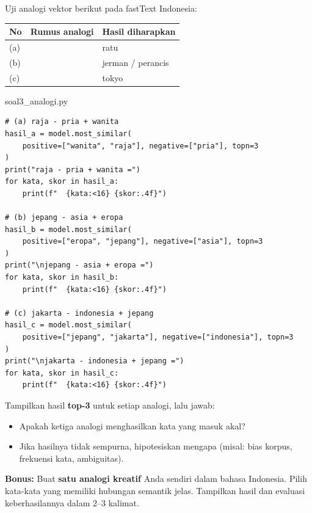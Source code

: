 \documentclass[12pt, a4paper]{article}
\begin{document}
Uji analogi vektor berikut pada fastText Indonesia:

\begin{center}\small
\begin{tabular}{@{} C{0.6cm} L{6.5cm} L{4cm} @{}}
  \toprule \textbf{No} & \textbf{Rumus analogi} & \textbf{Hasil diharapkan} \\
  \midrule
  (a) &           & ratu \\
  (b) &          & jerman / perancis \\
  (c) &   & tokyo \\
  \bottomrule
\end{tabular}
\end{center}

\begin{codewindow}{soal3\_analogi.py}
\begin{lstlisting}[style=pycode]
# (a) raja - pria + wanita
hasil_a = model.most_similar(
    positive=["wanita", "raja"], negative=["pria"], topn=3
)
print("raja - pria + wanita =")
for kata, skor in hasil_a:
    print(f"  {kata:<16} {skor:.4f}")

# (b) jepang - asia + eropa
hasil_b = model.most_similar(
    positive=["eropa", "jepang"], negative=["asia"], topn=3
)
print("\njepang - asia + eropa =")
for kata, skor in hasil_b:
    print(f"  {kata:<16} {skor:.4f}")

# (c) jakarta - indonesia + jepang
hasil_c = model.most_similar(
    positive=["jepang", "jakarta"], negative=["indonesia"], topn=3
)
print("\njakarta - indonesia + jepang =")
for kata, skor in hasil_c:
    print(f"  {kata:<16} {skor:.4f}")
\end{lstlisting}
\end{codewindow}

Tampilkan hasil \textbf{top-3} untuk setiap analogi, lalu jawab:
\begin{itemize}
  \item Apakah ketiga analogi menghasilkan kata yang masuk akal?
  \item Jika hasilnya tidak sempurna, hipotesiskan mengapa (misal: bias korpus, frekuensi kata, ambiguitas).
\end{itemize}

\begin{callout}[ctpGreen]
\textbf{\color{ctpGreen}Bonus:} Buat \textbf{satu analogi kreatif} Anda sendiri dalam bahasa Indonesia. Pilih kata-kata yang memiliki hubungan semantik jelas. Tampilkan hasil dan evaluasi keberhasilannya dalam 2--3 kalimat.
\end{callout}
\end{document}
